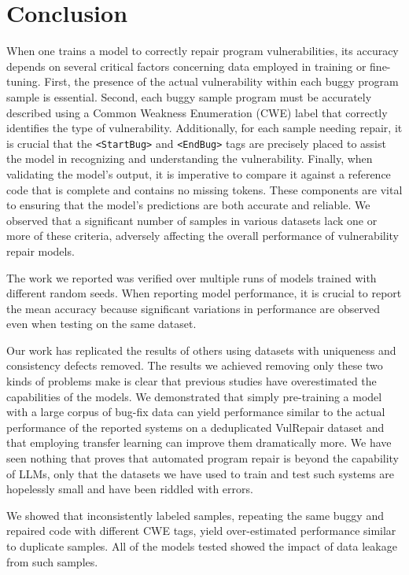 \section{Conclusion}
\label{Conclusion}


When one trains a model to correctly repair program vulnerabilities, its accuracy depends on several critical factors concerning data employed in training or fine-tuning.
First, the presence of the actual vulnerability within each buggy program sample is essential.
Second, each buggy sample program must be accurately described using a Common Weakness Enumeration (CWE) label that correctly identifies the type of vulnerability.
Additionally, for each sample needing repair, it is crucial that the \texttt{<StartBug>} and \texttt{<EndBug>} tags are precisely placed to assist the model in recognizing and understanding the vulnerability.
Finally, when validating the model's output, it is imperative to compare it against a reference code that is complete and contains no missing tokens.
These components are vital to ensuring that the model's predictions are both accurate and reliable.
We observed that a significant number of samples in various datasets lack one or more of these criteria, adversely affecting the overall performance of vulnerability repair models.

The work we reported was verified over multiple runs of models trained with different random seeds.
When reporting model performance, it is crucial to report the mean accuracy because significant variations in performance are observed even when testing on the same dataset. 

Our work has replicated the results of others using datasets with uniqueness and consistency defects removed.
The results we achieved removing only these two kinds of problems make is clear that previous studies have overestimated the capabilities of the models.
We demonstrated that simply pre-training a model with a large corpus of bug-fix data can yield performance similar to the actual performance of the reported systems on a deduplicated VulRepair dataset and that employing transfer learning can improve them dramatically more.
We have seen nothing that proves that automated program repair is beyond the capability of LLMs, only that the datasets we have used to train and test such systems are hopelessly small and have been riddled with errors.

We showed that inconsistently labeled samples, repeating the same buggy and repaired code with different CWE tags, yield over-estimated performance similar to duplicate samples.
All of the models tested showed the impact of data leakage from such samples.

